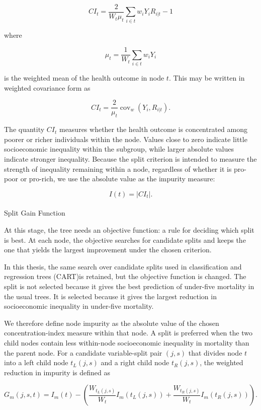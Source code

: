 \documentclass[
  11pt,
  a4paper,
]{article}
\makeatletter
\let\oldparagraph\paragraph
\renewcommand{\paragraph}{
    \@ifstar
      \xxxParagraphStar
      \xxxParagraphNoStar
  }
\newcommand{\xxxParagraphStar}[1]{\oldparagraph*{#1}\mbox{}}
\newcommand{\xxxParagraphNoStar}[1]{\oldparagraph{#1}\mbox{}}
\makeatother
\begin{document}
\[
CI_t = \frac{2}{W_t \mu_t} \sum_{i \in t} w_i Y_i R_{i|t} - 1
\]

where

\[
\mu_t = \frac{1}{W_t}\sum_{i \in t} w_i Y_i
\]

is the weighted mean of the health outcome in node \(t\). This may be
written in weighted covariance form as

\[
CI_t = \frac{2}{\mu_t}\operatorname{cov}_w(Y_i, R_{i|t}).
\]

The quantity \(CI_t\) measures whether the health outcome is
concentrated among poorer or richer individuals within the node. Values
close to zero indicate little socioeconomic inequality within the
subgroup, while larger absolute values indicate stronger inequality.
Because the split criterion is intended to measure the strength of
inequality remaining within a node, regardless of whether it is pro-poor
or pro-rich, we use the absolute value as the impurity measure:

\[
I(t) = |CI_t|.
\]

\paragraph{Split Gain Function}\label{sec-split-gain}

At this stage, the tree needs an objective function: a rule for deciding
which split is best. At each node, the objective searches for candidate
splits and keeps the one that yields the largest improvement under the
chosen criterion.

In this thesis, the same search over candidate splits used in
classification and regression trees (CART)is retained, but the objective
function is changed. The split is not selected because it gives the best
prediction of under-five mortality in the usual trees. It is selected
because it gives the largest reduction in socioeconomic inequality in
under-five mortality.

We therefore define node impurity as the absolute value of the chosen
concentration-index measure within that node. A split is preferred when
the two child nodes contain less within-node socioeconomic inequality in
mortality than the parent node. For a candidate variable-split pair
\((j,s)\) that divides node \(t\) into a left child node \(t_L(j,s)\)
and a right child node \(t_R(j,s)\), the weighted reduction in impurity
is defined as

\[
G_m(j, s, t)
=
I_m(t)
-
\left(
\frac{W_{t_L(j,s)}}{W_t} I_m(t_L(j,s))
+
\frac{W_{t_R(j,s)}}{W_t} I_m(t_R(j,s))
\right).
\]
\end{document}
